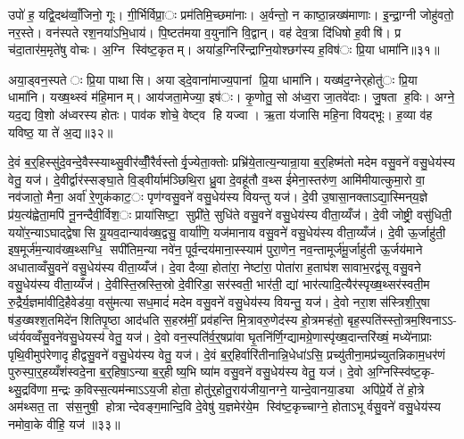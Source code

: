 
उपो॑ ह॒ यद्वि॒दथ॑व्वाँ॒जिनो॒ गूः। गी॒र्भिर्विप्रा॒ः प्रम॑तिमि॒च्छमा॑नाः। अ॒र्वन्तो॒ न काष्ठा॒न्नख्ष॑माणाः। इ॒न्द्रा॒ग्नी जोहु॑वतो॒ नर॒स्ते। वन॑स्पते रश॒नया॑ऽभि॒धाय॑। पि॒ष्टत॑मया व॒युना॑नि वि॒द्वान्। वह॑ देव॒त्रा दि॑धिषो ह॒वीषि॑। प्र च॑दा॒तार॑म॒मृते॑षु वोचः। अ॒ग्नि स्वि॑ष्ट॒कृतम्। अया॑ड॒ग्निरि॑न्द्राग्नि॒योश्छग॑स्य ह॒विष॑ः प्रि॒या धामा॑नि॥३१॥

अया॒ड्वन॒स्पतेः प्रि॒या पाथासि। अयाड्दे॒वाना॑माज्य॒पानां प्रि॒या धामा॑नि। यख्ष॑द॒ग्नेर्‌होतु॑ः प्रि॒या धामा॑नि। यख्ष॒थ्स्वं म॑हि॒मानम्। आय॑जता॒मेज्या॒ इष॑ः। कृ॒णोतु॒ सो अ॑ध्व॒रा जा॒तवे॑दाः। जु॒षता ह॒विः। अग्ने॒ यद॒द्य वि॒शो अ॑ध्वरस्य होतः। पाव॑क शोचे॒ वेष्ट्व हि यज्वा। ऋ॒ता य॑जासि महि॒ना वियद्भूः। ह॒व्या व॑ह यविष्ठ॒ या ते॑ अ॒द्य॥३२॥


दे॒वं ब॒र्॒हिस्सु॑दे॒वन्दे॒वैस्स्याथ्सु॒वीर॑व्वीँ॒रैर्वस्तोर्वृ॒ज्येता॒क्तोः प्रभ्रि॑ये॒तात्य॒न्यान्रा॒या ब॒र्॒हिष्म॑तो मदेम वसु॒वने॑ वसु॒धेय॑स्य वेतु॒ यज॑। दे॒वीर्द्वार॑स्सङ्घा॒ते वि॒ड्वीर्याम॑ञ्छिथि॒रा ध्रु॒वा दे॒वहू॑तौ व॒थ्स ई॑मेना॒स्तरु॑ण॒ आमि॑मीयात्कुमा॒रो वा॒ नव॑जातो॒ मैना॒ अर्वा॑ रे॒णुक॑काट॒ः पृण॑ग्वसु॒वने॑ वसु॒धेय॑स्य वियन्तु यज॑। दे॒वी उ॒षासा॒नक्ताऽद्या॒स्मिन्‌य॒ज्ञे प्र॑य॒त्य॑ह्वेता॒मपि॑ नू॒नन्दैवी॒र्विश॒ः प्राया॑सिष्टा॒ सुप्री॑ते॒ सुधि॑ते वसु॒वने॑ वसु॒धेय॑स्य वीता॒य्यँज॑। दे॒वी जोष्ट्री॒ वसु॑धिती॒ ययो॑र॒न्याऽघाद्द्वेषासि यू॒यव॒दान्याव॑ख्ष॒द्वसु॒ वार्या॑णि॒ यज॑मानाय वसु॒वने॑ वसु॒धेय॑स्य वीता॒य्यँज॑। दे॒वी ऊ॒र्जाहु॑ती॒ इष॒मूर्ज॑म॒न्याव॑ख्ष॒थ्सग्धि॒ सपी॑तिम॒न्या नवे॑न॒ पूर्व॒न्दय॑माना॒स्स्याम॑ पुरा॒णेन॒ नव॒न्तामूर्ज॑मू॒र्जाहु॑ती ऊ॒र्जय॑माने अधाताव्वँसु॒वने॑ वसु॒धेय॑स्य वीता॒य्यँज॑। दे॒वा दैव्या॒ होता॑रा॒ नेष्टा॑रा॒ पोता॑रा ह॒ताघ॑शसावाभ॒रद्व॑सू वसु॒वने वसु॒धेय॑स्य वीता॒य्यँज॑। दे॒वीस्ति॒स्रस्ति॒स्रो दे॒वीरिडा॒ सर॑स्वती॒ भार॑ती॒ द्यां भार॑त्यादि॒त्यैर॑स्पृख्ष॒थ्सर॑स्वती॒म रु॒द्रैर्य॒ज्ञमा॑वीदि॒हैवेड॑या॒ वसु॑मत्या सध॒मादं॑ मदेम वसु॒वने॑ वसु॒धेय॑स्य वियन्तु॒ यज॑। दे॒वो नरा॒शस॑स्त्रिशी॒र्॒षा ष॑ड॒ख्षश्श॒तमिदे॑नशितिपृ॒ष्ठा आद॑धति स॒हस्र॑मीं॒ प्रव॑हन्ति मि॒त्रावरु॒णेद॑स्य हो॒त्रमऱ्ह॑तो॒ बृह॒स्पति॑स्स्तो॒त्रम॒श्विनाऽऽ- ध्व॑र्यवव्वँसु॒वने॑वसु॒धेयस्य॑ वेतु॒ यज॑। दे॒वो वन॒स्पति॑र्व॒र्॒षप्रा॑वा घृ॒तनि॑र्णि॒ग्द्यामग्रे॒णास्पृ॑ख्ष॒दान्तरि॑ख्षं॒ मध्ये॑नाप्राः पृथि॒वीमुप॑रेणादृहीद्वसु॒वने॑ वसु॒धेय॑स्य वेतु॒ यज॑। दे॒वं ब॒र्॒हिर्वारि॑तीनान्नि॒धेधा॑ऽसि॒ प्रच्यु॑तीना॒मप्र॑च्युतन्निकाम॒धर॑णं पुरुस्पा॒र्॒हय्यँश॑स्वदे॒ना ब॒र्॒हिषा॒ऽन्या ब॒र्॒हीष्य॒भि ष्या॑म वसु॒वने॑ वसु॒धेय॑स्य वेतु॒ यज॑। दे॒वो अ॒ग्निस्स्वि॑ष्ट॒कृ- थ्सु॒द्रवि॑णा म॒न्द्रः क॒विस्स॒त्यम॑न्माऽऽय॒जी होता॒ होतु॑र्॒होतु॒राय॑जीया॒नग्ने॒ यान्दे॒वानया॒ड्या अपि॑प्रे॒र्ये ते॑ हो॒त्रे अम॑थ्सत॒ ता स॑स॒नुषी॒ होत्रान्देवङ्ग॒मान्दि॒वि दे॒वेषु॑ य॒ज्ञमेर॑ये॒म स्वि॑ष्ट॒कृच्चाग्ने॒ होताऽभूर्वसु॒वने॑ वसु॒धेय॑स्य नमोवा॒के वीहि॒ यज॑ ॥३३॥

